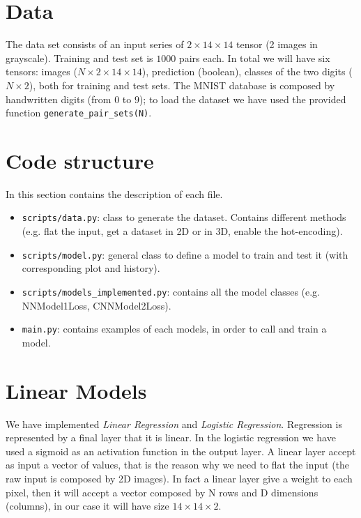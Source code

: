 \documentclass[journal, a4paper]{IEEEtran}
\begin{document}
\section{Data}
\label{sec:data}
The data set consists of an input series of $2\times14\times14$ tensor (2 images in grayscale). Training and test set is $1000$ pairs each. In total we will have six tensors: images ($N\times2\times14\times14$), prediction (boolean), classes of the two digits ($N\times2$), both for training and test sets. The MNIST database is composed by handwritten digits (from $0$ to $9$); to load the dataset we have used the provided function \texttt{generate\_pair\_sets(N)}.

\section{Code structure}
\label{sec:codestruc}
In this section contains the description of each file.
\begin{itemize}
    \item \texttt{scripts/data.py}: class to generate the dataset. Contains different methods (e.g. flat the input, get a dataset in 2D or in 3D, enable the hot-encoding).
    \item \texttt{scripts/model.py}: general class to define a model to train and test it (with corresponding plot and history).
    \item \texttt{scripts/models\_implemented.py}: contains all the model classes (e.g. NNModel1Loss, CNNModel2Loss).
    \item \texttt{main.py}: contains examples of each models, in order to call and train a model.
\end{itemize}

\section{Linear Models}
\label{sec:linearmodel}
We have implemented \textit{Linear Regression} and \textit{Logistic Regression}. Regression is represented by a final layer that it is linear. In the logistic regression we have used a sigmoid as an activation function in the output layer. A linear layer accept as input a vector of values, that is the reason why we need to flat the input (the raw input is composed by 2D images). In fact a linear layer give a weight to each pixel, then it will accept a vector composed by N rows and D dimensions (columns), in our case it will have size $14 \times 14 \times 2$.
\end{document}
